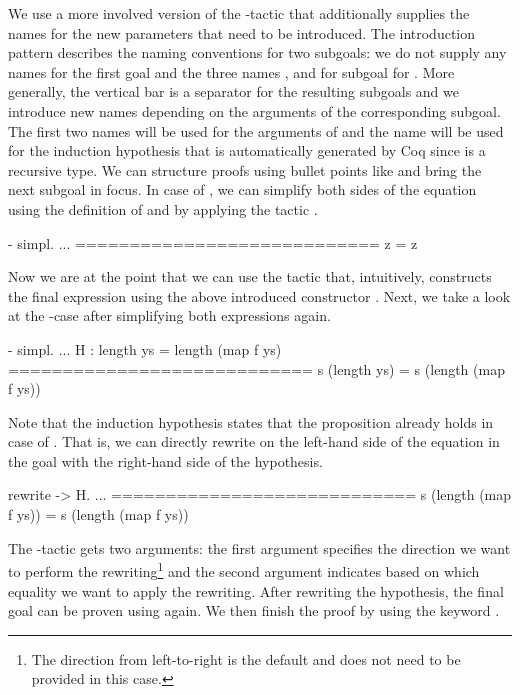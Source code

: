 We use a more involved version of the -tactic that additionally supplies the names for the new parameters that need to be introduced.
The introduction pattern \cinl{[ | y ys H ]} describes the naming conventions for two subgoals: we do not supply any names for the first goal and the three names ,  and  for subgoal for .
More generally, the vertical bar is a separator for the resulting subgoals and we introduce new names depending on the arguments of the corresponding subgoal.
The first two names will be used for the arguments of  and the name  will be used for the induction hypothesis that is automatically generated by Coq since  is a recursive type.
We can structure proofs using bullet points like \cinl{-,+,*} and bring the next subgoal in focus.
In case of , we can simplify both sides of the equation using the definition of  and  by applying the tactic .

\begin{cproof}{- simpl.}
  ...
  ============================
  z = z
\end{cproof}

Now we are at the point that we can use the tactic  that, intuitively, constructs the final expression using the above introduced constructor .
Next, we take a look at the -case after simplifying both expressions again.

\begin{cproof}{- simpl.}
  ...
  H : length ys = length (map f ys)
  ============================
  s (length ys) = s (length (map f ys))
\end{cproof}

Note that the induction hypothesis  states that the proposition already holds in case of .
That is, we can directly rewrite  on the left-hand side of the equation in the goal with the right-hand side of the hypothesis.

\begin{cproof}{rewrite -> H.}
  ...
  ============================
  s (length (map f ys)) =
  s (length (map f ys))
\end{cproof}

The -tactic gets two arguments: the first argument specifies the direction we want to perform the rewriting\footnote{The direction from left-to-right is the default and does not need to be provided in this case.} and the second argument indicates based on which equality we want to apply the rewriting.
After rewriting the hypothesis, the final goal can be proven using  again.
We then finish the proof by using the keyword .


